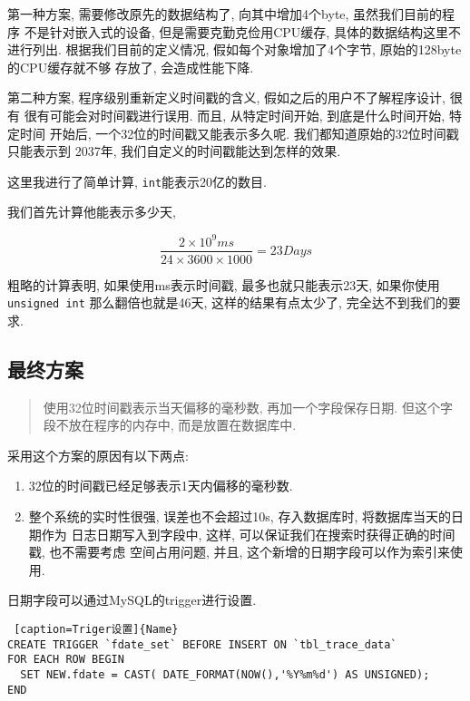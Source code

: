 第一种方案, 需要修改原先的数据结构了, 向其中增加4个byte,
虽然我们目前的程序 不是针对嵌入式的设备, 但是需要克勤克俭用CPU缓存,
具体的数据结构这里不进行列出. 根据我们目前的定义情况,
假如每个对象增加了4个字节, 原始的128byte的CPU缓存就不够 存放了,
会造成性能下降.

第二种方案, 程序级别重新定义时间戳的含义, 假如之后的用户不了解程序设计,
很有 很有可能会对时间戳进行误用. 而且, 从特定时间开始,
到底是什么时间开始, 特定时间 开始后, 一个32位的时间戳又能表示多久呢.
我们都知道原始的32位时间戳只能表示到 2037年,
我们自定义的时间戳能达到怎样的效果.

这里我进行了简单计算, \texttt{int}能表示20亿的数目.

我们首先计算他能表示多少天,

$$ \frac{2 \times 10^{9} ms }{24 \times 3600 \times 1000} = 23 Days$$

粗略的计算表明, 如果使用ms表示时间戳, 最多也就只能表示23天,
如果你使用\texttt{unsigned\ int} 那么翻倍也就是46天,
这样的结果有点太少了, 完全达不到我们的要求.

\subsection{最终方案}

\begin{quote}
使用32位时间戳表示当天偏移的毫秒数, 再加一个字段保存日期.
但这个字段不放在程序的内存中, 而是放置在数据库中.
\end{quote}

采用这个方案的原因有以下两点:

\begin{enumerate}
\def\labelenumi{\arabic{enumi}.}
\item
  32位的时间戳已经足够表示1天内偏移的毫秒数.
\item
  整个系统的实时性很强, 误差也不会超过10s, 存入数据库时,
  将数据库当天的日期作为 日志日期写入到字段中, 这样,
  可以保证我们在搜索时获得正确的时间戳, 也不需要考虑 空间占用问题, 并且,
  这个新增的日期字段可以作为索引来使用.
\end{enumerate}

日期字段可以通过MySQL的trigger进行设置.


\begin{lstlisting} [caption=Triger设置]{Name}
CREATE TRIGGER `fdate_set` BEFORE INSERT ON `tbl_trace_data`
FOR EACH ROW BEGIN
  SET NEW.fdate = CAST( DATE_FORMAT(NOW(),'%Y%m%d') AS UNSIGNED);
END
\end{lstlisting}


